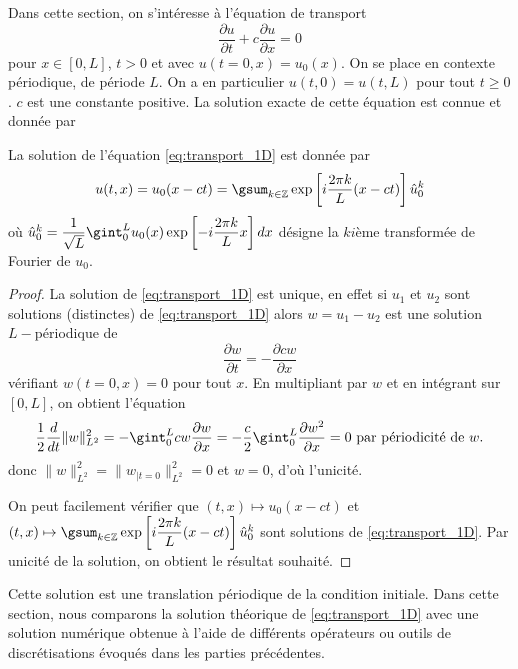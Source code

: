 Dans cette section, on s'intéresse à l'équation de transport
\begin{equation}
\dfrac{\partial u}{\partial t} + c \dfrac{\partial u}{\partial x} = 0
\label{eq:transport_1D}
\end{equation}
pour $x \in [0,L]$, $t>0$ et avec $u(t=0,x)=u_0(x)$. On se place en contexte périodique, de période $L$. On a en particulier $u(t,0)=u(t,L)$ pour tout $t \geq 0$. $c$ est une constante positive. La solution exacte de cette équation est connue et donnée par 
\begin{proposition}
La solution de l'équation \eqref{eq:transport_1D} est donnée par 
\begin{equation}
u(t,x) = u_0(x-ct) = \gsum_{k \in \mathbb{Z}} \exp \left[ i \dfrac{2 \pi k}{L} (x-ct) \right] \hat{u}_0^k
\end{equation}
où $\hat{u}_0^k = \dfrac{1}{\sqrt{L}} \gint_0^L u_0(x) \exp \left[ - i \dfrac{2 \pi k}{L}x \right] dx$ désigne la $ki$ème transformée de Fourier de $u_0$.
\end{proposition}

\begin{proof}
La solution de \eqref{eq:transport_1D} est unique, en effet si $u_1$ et $u_2$ sont solutions (distinctes) de \eqref{eq:transport_1D} alors $w = u_1-u_2$ est une solution $L-$périodique de 
\begin{equation}
\dfrac{\partial w}{\partial t} = - \dfrac{\partial  cw}{\partial x}
\end{equation}
vérifiant $w(t=0,x)=0$ pour tout $x$. En multipliant par $w$ et en intégrant sur $[0,L]$, on obtient l'équation
\begin{equation*}
\dfrac{1}{2} \dfrac{d}{dt} \| w \|_{L^2}^2 = - \gint_{0}^L cw \dfrac{\partial w}{\partial x} = - \dfrac{c}{2} \gint_{0}^L \dfrac{\partial w^2}{\partial x} = 0 \text{ par périodicité de }w.
\end{equation*}
donc $\| w \|_{L^2}^2=\| w_{|t=0} \|_{L^2}^2 = 0$ et $w=0$, d'où l'unicité.

On peut facilement vérifier que $(t,x) \mapsto u_0(x-ct)$ et $(t,x) \mapsto \gsum_{k \in \mathbb{Z}} \exp \left[ i \dfrac{2 \pi k}{L} (x-ct) \right] \hat{u}_0^k$ sont solutions de \eqref{eq:transport_1D}. Par unicité de la solution, on obtient le résultat souhaité.
\end{proof}
Cette solution est une translation périodique de la condition initiale. Dans cette section, nous comparons la solution théorique de \eqref{eq:transport_1D} avec une solution numérique obtenue à l'aide de différents opérateurs ou outils de discrétisations évoqués dans les parties précédentes.









